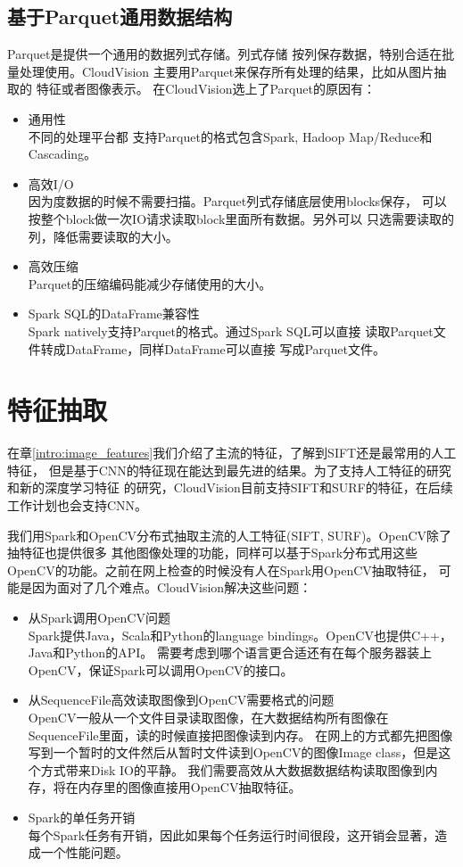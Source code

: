 \subsection{基于Parquet通用数据结构}
\label{subsec:parquet}
Parquet是提供一个通用的数据列式存储。列式存储
按列保存数据，特别合适在批量处理使用。CloudVision
主要用Parquet来保存所有处理的结果，比如从图片抽取的
特征或者图像表示。
在CloudVision选上了Parquet的原因有：
\begin{itemize}
  \item 通用性 \\
        不同的处理平台都
        支持Parquet的格式包含Spark, Hadoop Map/Reduce和Cascading。
  \item 高效I/O \\
        因为度数据的时候不需要扫描。Parquet列式存储底层使用blocks保存，
        可以按整个block做一次IO请求读取block里面所有数据。另外可以
        只选需要读取的列，降低需要读取的大小。
  \item 高效压缩 \\
        Parquet的压缩编码能减少存储使用的大小。
  \item Spark SQL的DataFrame兼容性 \\
        Spark natively支持Parquet的格式。通过Spark SQL可以直接
        读取Parquet文件转成DataFrame，同样DataFrame可以直接
        写成Parquet文件。
\end{itemize}



\section{特征抽取}
\label{sec:feature-extraction}
在章\ref{intro:image_features}我们介绍了主流的特征，了解到SIFT还是最常用的人工特征，
但是基于CNN的特征现在能达到最先进的结果。为了支持人工特征的研究和新的深度学习特征
的研究，CloudVision目前支持SIFT和SURF的特征，在后续工作计划也会支持CNN。

我们用Spark和OpenCV分布式抽取主流的人工特征(SIFT, SURF)。OpenCV除了抽特征也提供很多
其他图像处理的功能，同样可以基于Spark分布式用这些OpenCV的功能。之前在网上检查的时候没有人在Spark用OpenCV抽取特征，
可能是因为面对了几个难点。CloudVision解决这些问题：
\begin{itemize}
  \item 从Spark调用OpenCV问题 \\
        Spark提供Java，Scala和Python的language bindings。OpenCV也提供C++，Java和Python的API。
        需要考虑到哪个语言更合适还有在每个服务器装上OpenCV，保证Spark可以调用OpenCV的接口。
  \item 从SequenceFile高效读取图像到OpenCV需要格式的问题 \\
        OpenCV一般从一个文件目录读取图像，在大数据结构所有图像在SequenceFile里面，读的时候直接把图像读到内存。
        在网上的方式都先把图像写到一个暂时的文件然后从暂时文件读到OpenCV的图像Image class，但是这个方式带来Disk IO的平静。
        我们需要高效从大数据数据结构读取图像到内存，将在内存里的图像直接用OpenCV抽取特征。
  \item Spark的单任务开销 \\
        每个Spark任务有开销，因此如果每个任务运行时间很段，这开销会显著，造成一个性能问题。
\end{itemize}


